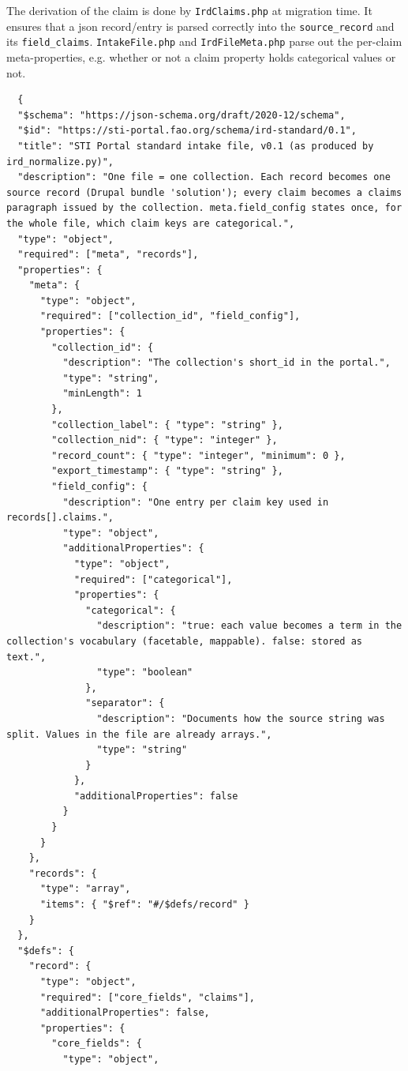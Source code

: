 \documentclass{scrartcl}
\begin{document}
The derivation of the claim is done by \texttt{IrdClaims.php} at migration time. It ensures that a json record/entry is parsed correctly into the \texttt{source\_record} and its \texttt{field\_claims}. \texttt{IntakeFile.php} and \texttt{IrdFileMeta.php} parse out the per-claim meta-properties, e.g. whether or not a claim property holds categorical values or not.
\begin{verbatim}
  {
  "$schema": "https://json-schema.org/draft/2020-12/schema",
  "$id": "https://sti-portal.fao.org/schema/ird-standard/0.1",
  "title": "STI Portal standard intake file, v0.1 (as produced by ird_normalize.py)",
  "description": "One file = one collection. Each record becomes one source record (Drupal bundle 'solution'); every claim becomes a claims paragraph issued by the collection. meta.field_config states once, for the whole file, which claim keys are categorical.",
  "type": "object",
  "required": ["meta", "records"],
  "properties": {
    "meta": {
      "type": "object",
      "required": ["collection_id", "field_config"],
      "properties": {
        "collection_id": {
          "description": "The collection's short_id in the portal.",
          "type": "string",
          "minLength": 1
        },
        "collection_label": { "type": "string" },
        "collection_nid": { "type": "integer" },
        "record_count": { "type": "integer", "minimum": 0 },
        "export_timestamp": { "type": "string" },
        "field_config": {
          "description": "One entry per claim key used in records[].claims.",
          "type": "object",
          "additionalProperties": {
            "type": "object",
            "required": ["categorical"],
            "properties": {
              "categorical": {
                "description": "true: each value becomes a term in the collection's vocabulary (facetable, mappable). false: stored as text.",
                "type": "boolean"
              },
              "separator": {
                "description": "Documents how the source string was split. Values in the file are already arrays.",
                "type": "string"
              }
            },
            "additionalProperties": false
          }
        }
      }
    },
    "records": {
      "type": "array",
      "items": { "$ref": "#/$defs/record" }
    }
  },
  "$defs": {
    "record": {
      "type": "object",
      "required": ["core_fields", "claims"],
      "additionalProperties": false,
      "properties": {
        "core_fields": {
          "type": "object",

\end{verbatim}
\end{document}

